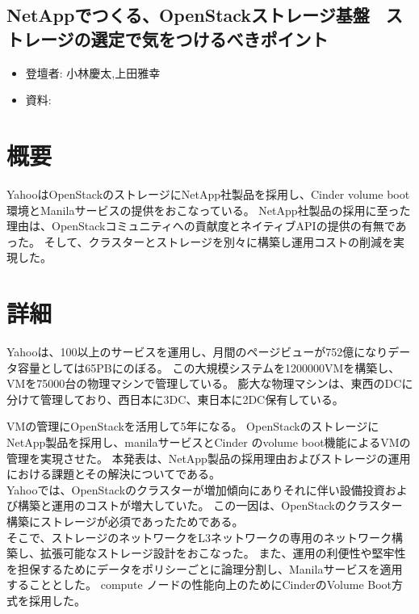 \begin{center}
  \section*{NetAppでつくる、OpenStackストレージ基盤 ~ストレージの選定で気をつけるべきポイント~}
\end{center}


\begin{flushright}
  \begin{itemize}
  \item   登壇者: 小林慶太,上田雅幸
  \item 資料: 
  \end{itemize}
\end{flushright}

\section*{概要}

YahooはOpenStackのストレージにNetApp社製品を採用し、Cinder volume boot環境とManilaサービスの提供をおこなっている。
NetApp社製品の採用に至った理由は、OpenStackコミュニティへの貢献度とネイティブAPIの提供の有無であった。
そして、クラスターとストレージを別々に構築し運用コストの削減を実現した。

\section*{詳細}

Yahooは、100以上のサービスを運用し、月間のページビューが752億になりデータ容量としては65PBにのぼる。
この大規模システムを1200000VMを構築し、VMを75000台の物理マシンで管理している。
膨大な物理マシンは、東西のDCに分けて管理しており、西日本に3DC、東日本に2DC保有している。

VMの管理にOpenStackを活用して5年になる。
OpenStackのストレージにNetApp製品を採用し、manilaサービスとCinder のvolume boot機能によるVMの管理を実現させた。
本発表は、NetApp製品の採用理由およびストレージの運用における課題とその解決についてである。\\

Yahooでは、OpenStackのクラスターが増加傾向にありそれに伴い設備投資および構築と運用のコストが増大していた。
この一因は、OpenStackのクラスター構築にストレージが必須であったためである。\\

そこで、ストレージのネットワークをL3ネットワークの専用のネットワーク構築し、拡張可能なストレージ設計をおこなった。
また、運用の利便性や堅牢性を担保するためにデータをポリシーごとに論理分割し、Manilaサービスを適用することとした。
compute ノードの性能向上のためにCinderのVolume Boot方式を採用した。\\

